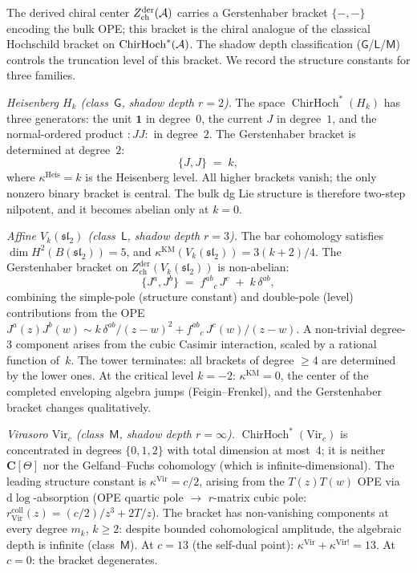\begin{remark}
\label{rem:bulk-ope-gerstenhaber-bracket}
The derived chiral center $Z^{\mathrm{der}}_{\mathrm{ch}}(\mathcal{A})$
carries a Gerstenhaber bracket $\{-,-\}$ encoding the bulk OPE;
this bracket is the chiral analogue of the classical Hochschild
bracket on $\operatorname{ChirHoch}^*(\mathcal{A})$.
The shadow depth classification ($\mathsf{G}$/$\mathsf{L}$/$\mathsf{M}$)
controls the truncation level of this bracket.
We record the structure constants for three families.

\emph{Heisenberg $H_k$ (class~$\mathsf{G}$, shadow depth $r=2$).}
The space $\operatorname{ChirHoch}^*(H_k)$ has three generators: the
unit $\mathbf{1}$ in degree~$0$, the current $J$ in degree~$1$,
and the normal-ordered product ${:}JJ{:}$ in degree~$2$.
The Gerstenhaber bracket is determined at degree~$2$:
\[
 \{J, J\} \;=\; k,
\]
where $\kappa^{\mathrm{Heis}} = k$ is the Heisenberg level.
All higher brackets vanish; the only nonzero binary bracket is central.
The bulk dg Lie structure is therefore two-step nilpotent, and it
becomes abelian only at $k=0$.

\emph{Affine $V_k(\mathfrak{sl}_2)$ (class~$\mathsf{L}$, shadow depth $r=3$).}
The bar cohomology satisfies $\dim H^2(B(\mathfrak{sl}_2)) = 5$,
and $\kappa^{\mathrm{KM}}(V_k(\mathfrak{sl}_2)) = 3(k+2)/4$.
The Gerstenhaber bracket on
$Z^{\mathrm{der}}_{\mathrm{ch}}(V_k(\mathfrak{sl}_2))$ is
non-abelian:
\[
 \{J^a, J^b\}
 \;=\; f^{ab}{}_{c} \, J^c
 \;+\; k \, \delta^{ab},
\]
combining the simple-pole (structure constant) and double-pole
(level) contributions from the OPE
$J^a(z) J^b(w) \sim
 k\,\delta^{ab}/(z-w)^2 + f^{ab}{}_{c}\,J^c(w)/(z-w)$.
A non-trivial degree-$3$ component arises from the cubic Casimir
interaction, scaled by a rational function of~$k$.
The tower terminates: all brackets of degree $\geq 4$ are determined
by the lower ones.
At the critical level $k = -2$: $\kappa^{\mathrm{KM}} = 0$, the
center of the completed enveloping algebra jumps
(Feigin--Frenkel), and the Gerstenhaber bracket changes
qualitatively.

\emph{Virasoro $\mathrm{Vir}_c$ (class~$\mathsf{M}$, shadow depth $r = \infty$).}
$\operatorname{ChirHoch}^*(\mathrm{Vir}_c)$ is concentrated in
degrees $\{0,1,2\}$ with total dimension at most~$4$; it is neither
$\mathbf{C}[\Theta]$ nor the Gelfand--Fuchs cohomology (which is
infinite-dimensional).
The leading structure constant is $\kappa^{\mathrm{Vir}} = c/2$,
arising from the $T(z)T(w)$ OPE via $\mathrm{d}\log$-absorption
(OPE quartic pole $\to$ $r$-matrix cubic pole:
\(r_{\mathrm{Vir}}^{\mathrm{coll}}(z) = (c/2)/z^3 + 2T/z\)).
The bracket has non-vanishing components at every degree $m_k$,
$k \geq 2$: despite bounded cohomological amplitude, the algebraic
depth is infinite (class~$\mathsf{M}$).
At $c = 13$ (the self-dual point):
$\kappa^{\mathrm{Vir}} + \kappa^{\mathrm{Vir}!} = 13$.
At $c=0$: the bracket degenerates.


\end{remark}
